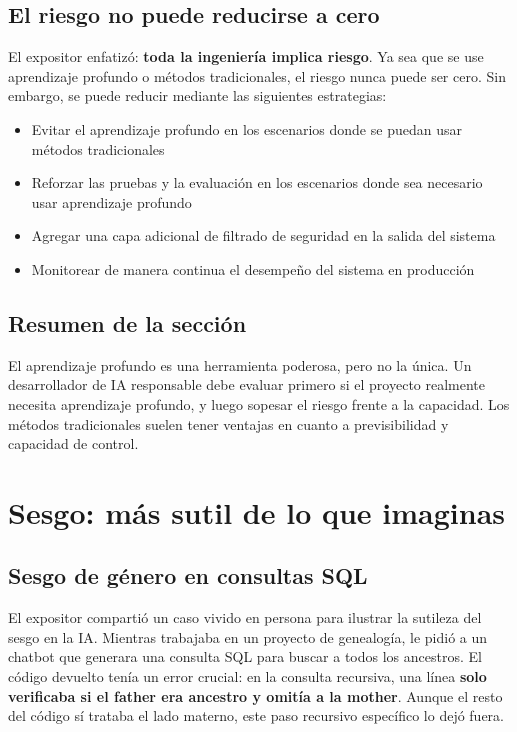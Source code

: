 \documentclass[a4paper]{article}
\begin{document}
\subsection{El riesgo no puede reducirse a cero}

El expositor enfatizó: \textbf{toda la ingeniería implica riesgo}. Ya sea que se use aprendizaje profundo o métodos tradicionales, el riesgo nunca puede ser cero. Sin embargo, se puede reducir mediante las siguientes estrategias:

\begin{itemize}
    \item Evitar el aprendizaje profundo en los escenarios donde se puedan usar métodos tradicionales
    \item Reforzar las pruebas y la evaluación en los escenarios donde sea necesario usar aprendizaje profundo
    \item Agregar una capa adicional de filtrado de seguridad en la salida del sistema
    \item Monitorear de manera continua el desempeño del sistema en producción
\end{itemize}

\subsection{Resumen de la sección}

El aprendizaje profundo es una herramienta poderosa, pero no la única. Un desarrollador de IA responsable debe evaluar primero si el proyecto realmente necesita aprendizaje profundo, y luego sopesar el riesgo frente a la capacidad. Los métodos tradicionales suelen tener ventajas en cuanto a previsibilidad y capacidad de control.

\section{Sesgo: más sutil de lo que imaginas}

\subsection{Sesgo de género en consultas SQL}

El expositor compartió un caso vivido en persona para ilustrar la sutileza del sesgo en la IA. Mientras trabajaba en un proyecto de genealogía, le pidió a un chatbot que generara una consulta SQL para buscar a todos los ancestros. El código devuelto tenía un error crucial: en la consulta recursiva, una línea \textbf{solo verificaba si el father era ancestro y omitía a la mother}. Aunque el resto del código sí trataba el lado materno, este paso recursivo específico lo dejó fuera.
\end{document}
